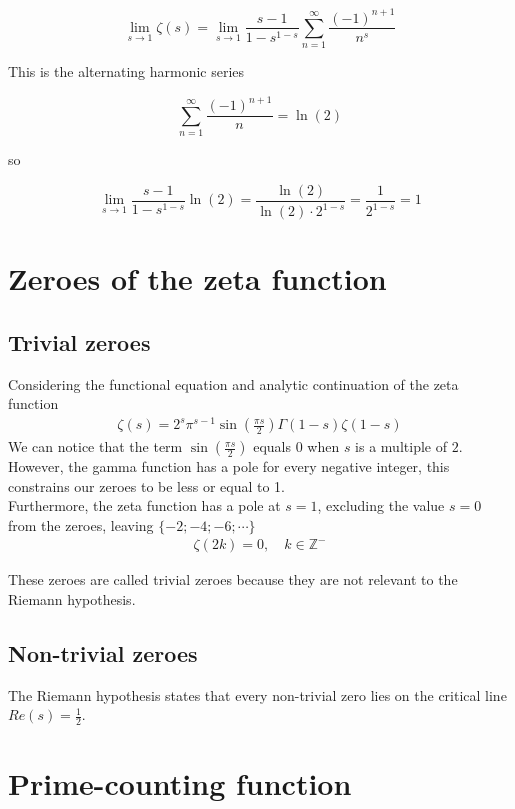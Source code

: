 \documentclass{article}
\begin{document}
\[
    \lim_{s\to 1} \zeta(s) =
    \lim_{s\to 1} \frac{s-1}{1-s^{1-s}} \sum_{n=1}^{\infty} \frac{{(-1)}^{n+1}}{n^s}
\]

This is the alternating harmonic series

\[
    \sum_{n=1}^{\infty} \frac{{(-1)}^{n+1}}{n}=\ln(2)
\]

so

\[
    \lim_{s\to 1} \frac{s-1}{1-s^{1-s}} \ln(2)
    = \frac{\ln(2)}{\ln(2) \cdot 2^{1-s}}
    = \frac{1}{2^{1-s}} = 1
\]

\section{Zeroes of the zeta function}

\subsection{Trivial zeroes}

Considering the functional equation and analytic continuation of the zeta function
\begin{align*}
    \zeta(s)=2^s\pi^{s-1}\sin\left(\frac{\pi s}{2}\right)\Gamma(1-s)\zeta(1-s)
\end{align*}
We can notice that the term \(\sin\left(\frac{\pi s}{2}\right)\) equals \(0\) when \(s\) is a multiple of \(2\).
\\
However, the gamma function has a pole for every negative integer, this constrains our zeroes to be less or equal to 1.\\
Furthermore, the zeta function has a pole at \(s=1\), excluding the value \(s=0\) from the zeroes, leaving \(\{-2;-4;-6;\cdots\}\)
\begin{align*}
    \zeta(2k)=0,
    \quad k\in \mathbb{Z}^{-}
\end{align*}

These zeroes are called trivial zeroes because they are not relevant to the Riemann hypothesis.

\subsection{Non-trivial zeroes}

The Riemann hypothesis states that every non-trivial zero lies on the critical line \(Re(s)=\frac{1}{2}\).

\pagebreak

\section{Prime-counting function}
\end{document}
